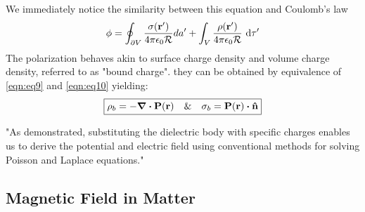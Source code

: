 \documentclass{article}
\numberwithin{equation}{section}
\begin{document}
%
We immediately notice the similarity between this equation and Coulomb's law
%
\begin{equation}
    \phi=\oint_{\partial V} \frac{\sigma(\vb{r'})}{4\pi\epsilon_0 \mathcal{R}} da' + \int_V \frac{\rho(\vb{r'})}{4\pi\epsilon_0 \mathcal{R}} \ \dd\tau'\label{eqn:eq10}
\end{equation}
%
The polarization behaves akin to surface charge density and volume charge density, referred to as "bound charge". they can be obtained by equivalence of \eqref{eqn:eq9} and \eqref{eqn:eq10} yielding:
%
\begin{equation}
\label{eqn:eq11}
\boxed{\rho_b=-\div\vb{P}(\vb{r})\quad \&\quad \sigma_b=\vb{P}(\vb{r})\vdot\vu{n}}
\end{equation}
%
\par
"As demonstrated, substituting the dielectric body with specific charges enables us to derive the potential and electric field using conventional methods for solving Poisson and Laplace equations."\cite{book:91141798}

\subsection{Magnetic Field in Matter}
\end{document}
